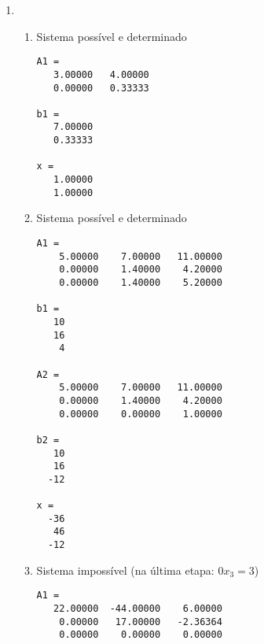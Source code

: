 \documentclass[a4paper]{article}
\begin{document}
\begin{enumerate}
\item %
  \begin{enumerate}
  \item Sistema possível e determinado
    \begin{verbatim}
A1 =
   3.00000   4.00000
   0.00000   0.33333

b1 =
   7.00000
   0.33333

x =
   1.00000
   1.00000
\end{verbatim}
    
  \item Sistema possível e determinado
\begin{verbatim}
A1 =
    5.00000    7.00000   11.00000
    0.00000    1.40000    4.20000
    0.00000    1.40000    5.20000

b1 =
   10
   16
    4

A2 =
    5.00000    7.00000   11.00000
    0.00000    1.40000    4.20000
    0.00000    0.00000    1.00000

b2 =
   10
   16
  -12

x =
  -36
   46
  -12
\end{verbatim}

  \item Sistema impossível (na última etapa: $0x_3 = 3$)
\begin{verbatim}
A1 =
   22.00000  -44.00000    6.00000
    0.00000   17.00000   -2.36364
    0.00000    0.00000    0.00000


\end{verbatim}
\end{enumerate}
\end{enumerate}
\end{document}
